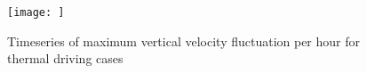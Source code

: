 \begin{figure}
    \centering
    \texttt{[image: ]}
    \caption{Timeseries of maximum vertical velocity fluctuation per hour for thermal driving cases}
    \label{fig:max_w2_timeseries}
\end{figure}